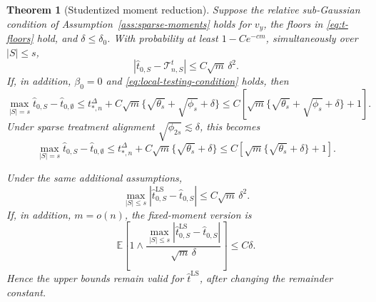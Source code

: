 \documentclass[a4paper,11pt,english]{article}
\newtheorem{theorem}{Theorem}[section]
\newcommand{\E}{\mathbb E}
\begin{document}
\begin{theorem}[Studentized moment reduction]
\label{thm:studentized-search}
Suppose the relative sub-Gaussian condition of
Assumption~\ref{ass:sparse-moments} holds for $v_y$, the floors in
\eqref{eq:t-floors} hold, and $\delta\le\delta_0$.  With probability at least $1-Ce^{-cm}$,
simultaneously over $|S|\le s$,
\begin{equation}\label{eq:critical-studentized-expansion}
        \left|
        \hat t_{0,S}-\mathcal T^t_{n,S}
        \right|
        \le C\sqrt m\,\delta^2.
\end{equation}
If, in addition, $\beta_0=0$ and
\eqref{eq:local-testing-condition} holds, then
\begin{equation}\label{eq:general-studentized-upper-scale}
        \max_{|S|=s}\hat t_{0,S}-\hat t_{0,\emptyset}
        \le t_{*,n}^\Delta
        +C\sqrt m\{\sqrt{\theta_s}+\sqrt{\phi_s}+\delta\}
        \le C\left[
        \sqrt m\{\sqrt{\theta_s}+\sqrt{\phi_s}+\delta\}+1
        \right].
\end{equation}
Under sparse treatment alignment
$\sqrt{\phi_{2s}}\lesssim\delta$, this becomes
\begin{equation}\label{eq:studentized-upper-scale}
        \max_{|S|=s}\hat t_{0,S}-\hat t_{0,\emptyset}
        \le t_{*,n}^\Delta+C\sqrt m\{\sqrt{\theta_s}+\delta\}
        \le C\left[
        \sqrt m\{\sqrt{\theta_s}+\delta\}+1
        \right].
\end{equation}

Under the same additional assumptions,
\begin{equation}\label{eq:least-squares-transfer}
        \max_{|S|\le s}
        |\hat t^{\mathrm{LS}}_{0,S}-\hat t_{0,S}|
        \le C\sqrt m\,\delta^2.
\end{equation}
If, in addition, $m=o(n)$, the fixed-moment version is
\begin{equation}\label{eq:least-squares-truncated-transfer}
 \E\left[1\wedge
 \frac{\max_{|S|\le s}|\hat t^{\mathrm{LS}}_{0,S}-\hat t_{0,S}|}
 {\sqrt m\,\delta}\right]
 \le C\delta.
\end{equation}
Hence the upper bounds remain valid for $\hat t^{\mathrm{LS}}$, after
changing the remainder constant.
\end{theorem}
\end{document}
